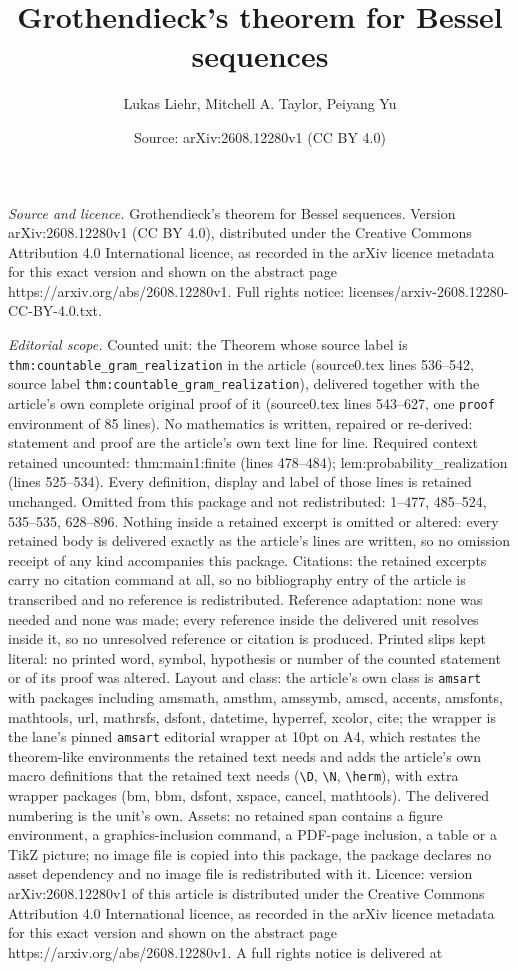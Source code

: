 \documentclass[10pt,a4paper]{amsart}
\title[Grothendieck's theorem for Bessel sequences]{Grothendieck's theorem for Bessel sequences}
\author{Lukas Liehr, Mitchell A. Taylor, Peiyang Yu}
\date{Source: arXiv:2608.12280v1 (CC BY 4.0)}
\begin{document}
\maketitle

\noindent\emph{Source and licence.} Grothendieck's theorem for Bessel sequences. Version arXiv:2608.12280v1 (CC BY 4.0), distributed under the Creative Commons Attribution 4.0 International licence, as recorded in the arXiv licence metadata for this exact version and shown on the abstract page https://arxiv.org/abs/2608.12280v1. Full rights notice: licenses/arxiv-2608.12280-CC-BY-4.0.txt.\par\smallskip

\noindent\textit{Editorial scope.} Counted unit: the Theorem whose source label is \texttt{thm:countable\_gram\_realization} in the article (source0.tex lines 536--542, source label \texttt{thm:countable\_gram\_realization}), delivered together with the article's own complete original proof of it (source0.tex lines 543--627, one \texttt{proof} environment of 85 lines). No mathematics is written, repaired or re-derived: statement and proof are the article's own text line for line. Required context retained uncounted: thm:main1:finite (lines 478--484); lem:probability\_realization (lines 525--534). Every definition, display and label of those lines is retained unchanged. Omitted from this package and not redistributed: 1--477, 485--524, 535--535, 628--896. Nothing inside a retained excerpt is omitted or altered: every retained body is delivered exactly as the article's lines are written, so no omission receipt of any kind accompanies this package. Citations: the retained excerpts carry no citation command at all, so no bibliography entry of the article is transcribed and no reference is redistributed. Reference adaptation: none was needed and none was made; every reference inside the delivered unit resolves inside it, so no unresolved reference or citation is produced. Printed slips kept literal: no printed word, symbol, hypothesis or number of the counted statement or of its proof was altered. Layout and class: the article's own class is \texttt{amsart} with packages including amsmath, amsthm, amssymb, amscd, accents, amsfonts, mathtools, url, mathrsfs, dsfont, datetime, hyperref, xcolor, cite; the wrapper is the lane's pinned \texttt{amsart} editorial wrapper at 10pt on A4, which restates the theorem-like environments the retained text needs and adds the article's own macro definitions that the retained text needs (\texttt{\textbackslash D}, \texttt{\textbackslash N}, \texttt{\textbackslash herm}), with extra wrapper packages (bm, bbm, dsfont, xspace, cancel, mathtools). The delivered numbering is the unit's own. Assets: no retained span contains a figure environment, a graphics-inclusion command, a PDF-page inclusion, a table or a TikZ picture; no image file is copied into this package, the package declares no asset dependency and no image file is redistributed with it. Licence: version arXiv:2608.12280v1 of this article is distributed under the Creative Commons Attribution 4.0 International licence, as recorded in the arXiv licence metadata for this exact version and shown on the abstract page https://arxiv.org/abs/2608.12280v1. A full rights notice is delivered at 
\end{document}
